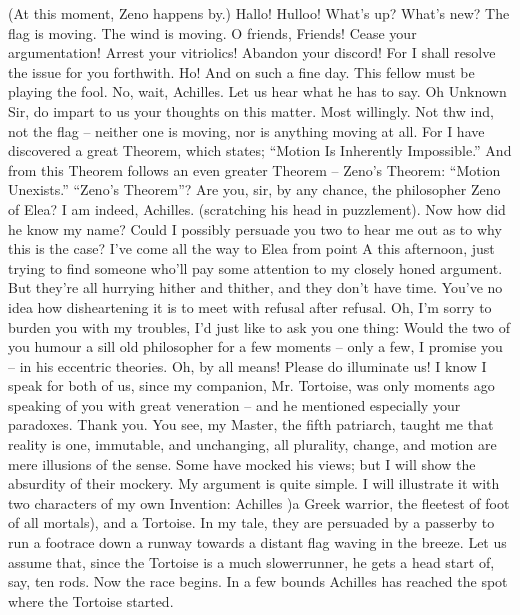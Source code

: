 (At this moment, Zeno happens by.)
\zeno Hallo! Hulloo! What’s up? What’s new?
\achilles The flag is moving.
\tortoise The wind is moving.
\zeno O friends, Friends! Cease your argumentation! Arrest your vitriolics! Abandon your
      discord! For I shall resolve the issue for you forthwith. Ho! And on such a fine day.
\achilles This fellow must be playing the fool.
\tortoise No, wait, Achilles. Let us hear what he has to say. Oh Unknown Sir, do impart to
      us your thoughts on this matter.
\zeno Most willingly. Not thw ind, not the flag – neither one is moving, nor is anything moving
      at all. For I have discovered a great Theorem, which states; “Motion Is Inherently
      Impossible.” And from this Theorem follows an even greater Theorem – Zeno’s
      Theorem: “Motion Unexists.”
\achilles “Zeno’s Theorem”? Are you, sir, by any chance, the philosopher Zeno of Elea?
\zeno I am indeed, Achilles.
\achilles (scratching his head in puzzlement). Now how did he know my name?
\zeno Could I possibly persuade you two to hear me out as to why this is the case? I’ve come
      all the way to Elea from point A this afternoon, just trying to find someone who’ll pay
      some attention to my closely honed argument. But they’re all hurrying hither and thither,
      and they don’t have time. You’ve no idea how disheartening it is to meet with refusal
      after refusal. Oh, I’m sorry to burden you with my troubles, I’d just like to ask you one
      thing: Would the two of you humour a sill old philosopher for a few moments – only a
      few, I promise you – in his eccentric theories.
\achilles Oh, by all means! Please do illuminate us! I know I speak for both of us, since my
      companion, Mr. Tortoise, was only moments ago speaking of you with great veneration –
      and he mentioned especially your paradoxes.
\zeno Thank you. You see, my Master, the fifth patriarch, taught me that reality is one,
      immutable, and unchanging, all plurality, change, and motion are mere illusions of the
      sense. Some have mocked his views; but I will show the absurdity of their mockery. My
      argument is quite simple. I will illustrate it with two characters of my own Invention:
      Achilles )a Greek warrior, the fleetest of foot of all mortals), and a Tortoise. In my tale,
      they are persuaded by a passerby to run a footrace down a runway towards a distant flag
      waving in the breeze. Let us assume that, since the Tortoise is a much slowerrunner, he
      gets a head start of, say, ten rods. Now the race begins. In a few bounds Achilles has
      reached the spot where the Tortoise started.




